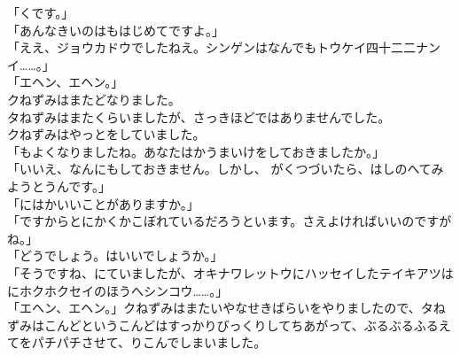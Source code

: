 \documentclass[
a4paper,
10pt,
book]
{tarticle}
\begin{document}
\newpage
\thispagestyle{fancy}
\fancyhead[R]{\empty}
「くです。」\\
「あんなきいのはもはじめてですよ。」\\
「ええ、ジョウカドウでしたねえ。シンゲンはなんでもトウケイ四十二二ナンイ……。」\\
「エヘン、エヘン。」\\
\indent クねずみはまたどなりました。\\
\indent タねずみはまたくらいましたが、さっきほどではありませんでした。\\
\indent クねずみはやっとをしていました。\\
「もよくなりましたね。あなたはかうまいけをしておきましたか。」\\
「いいえ、なんにもしておきません。しかし、 がくつづいたら、はしのへてみようとうんです。」\\
「にはかいいことがありますか。」\\
「ですからとにかくかこぼれているだろうといます。さえよければいいのですがね。」\\
「どうでしょう。はいいでしょうか。」\\
「そうですね、にていましたが、オキナワレットウにハッセイしたテイキアツはにホクホクセイのほうへシンコウ……。」\\
「エヘン、エヘン。」クねずみはまたいやなせきばらいをやりましたので、タねずみはこんどというこんどはすっかりびっくりしてちあがって、ぶるぶるふるえてをパチパチさせて、りこんでしまいました。
\end{document}
